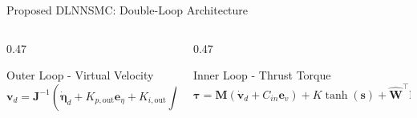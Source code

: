\documentclass[aspectratio=169,10pt]{beamer}
\begin{document}
\begin{frame}{Proposed DLNNSMC: Double-Loop Architecture}
\vspace{-6pt}
\begin{columns}[T]
\begin{column}{0.47\textwidth}
  \begin{block}{\small Outer Loop - Virtual Velocity}
    \vspace{3pt}
    \[
      \mathbf{v}_d = \mathbf{J}^{-1}\!\left(\dot{\bm{\eta}}_d
        + K_{p,\text{out}}\mathbf{e}_\eta
        + K_{i,\text{out}}\!\textstyle\int\!\mathbf{e}_\eta\right)
    \]
  \end{block}
\end{column}
\begin{column}{0.47\textwidth}
  \begin{block}{\small Inner Loop - Thrust Torque}
    \[
      \bm{\tau} = \mathbf{M}(\dot{\mathbf{v}}_d + C_{in}\mathbf{e}_v)
      + K\tanh(\mathbf{s}) + \hat{\mathbf{W}}^\top\mathbf{h}(\mathbf{v})
    \]
  \end{block}
\end{column}
\end{columns}
\end{frame}
\end{document}
